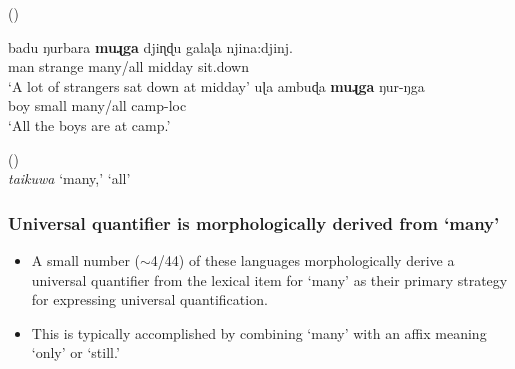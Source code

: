 \documentclass{article}
\begin{document}
\begin{exe}
   (\citealt[56,65]{platt72}) 
  \begin{xlist}
    \ex \gll badu ŋurbara \textbf{muɻga} {djiɳɖu galaɭa} njina:djinj. \\ 
    man  strange  many/all  midday         sit.down\\
    \glt `A lot of strangers sat down at midday'
    \ex \gll uɭa ambuɖa \textbf{muɻga} ŋur-ŋga  \\
    boy   small    many/all      camp-{\sc loc}\\
    \glt        `All the boys are at camp.'%
  \end{xlist}
   (\citealt[85,107]{osborne74})\\
  {\it taikuwa} `many,' `all'

\end{exe}


\subsubsection{Universal quantifier is morphologically derived from `many'}

\begin{itemize}
\item A small number ($\sim$4/44) of these languages morphologically derive a universal quantifier from the lexical item for `many' as their primary strategy for expressing universal quantification.
\item This is typically accomplished by combining `many' with an affix meaning `only' or `still.'
\end{itemize}
\end{document}
